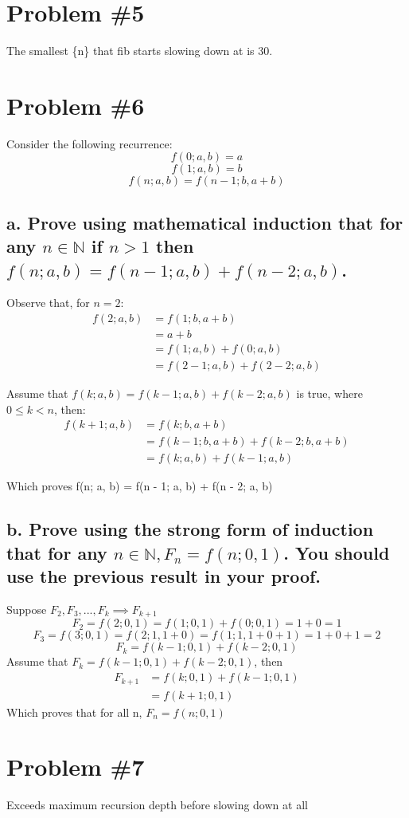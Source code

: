 \documentclass{article}
\newcommand {\N}{\mathbb{N}}
\begin{document}
\section*{Problem \#5}
The smallest \{n\} that fib starts slowing down at is 30.

\section*{Problem \#6}
Consider the following recurrence:
\[f(0; a, b) = a\]
\[f(1; a, b) = b\]
\[f(n; a, b) = f(n - 1; b, a + b)\]
\subsection*{a. Prove using mathematical induction that for any \(n \in \N\) if \(n > 1\) then \(f(n; a, b) = f(n - 1; a, b) + f(n - 2; a, b)\).}
Observe that, for \(n = 2\):
\begin{align}
f(2; a, b) &= f(1; b, a + b)\\
&= a + b\\
&= f(1; a, b) + f(0; a, b)\\
&= f(2 - 1; a, b) + f(2 - 2; a, b)
\end{align}

Assume that \(f(k; a, b) = f(k - 1; a, b) + f(k - 2; a, b)\) is true, where \(0 \leq k < n\), then:
\begin{align}
f(k + 1; a, b) &= f(k; b, a + b)\\
&= f(k - 1; b, a + b) + f(k - 2; b, a + b)\\
&= f(k; a, b) + f(k - 1; a, b)
\end{align}

Which proves f(n; a, b) = f(n - 1; a, b) + f(n - 2; a, b)
\subsection*{b. Prove using the strong form of induction that for any \(n \in \N, F_n = f(n; 0, 1)\). You should use the previous
result in your proof.}
Suppose \(F_2, F_3, ..., F_k \implies F_{k+1}\)
\[F_2 = f(2; 0, 1) = f(1; 0, 1) + f(0; 0, 1) = 1 + 0 = 1\]
\[F_3 = f(3; 0, 1) = f(2; 1, 1 + 0) = f(1; 1, 1 + 0 + 1) = 1 + 0 + 1 = 2\]
\[F_k = f(k - 1; 0, 1) + f(k - 2; 0, 1)\]
Assume that \(F_k = f(k - 1; 0, 1) + f(k - 2; 0, 1)\), then
\begin{align}
F_{k+1} &= f(k; 0, 1) + f(k - 1; 0, 1)\\
&= f(k + 1; 0, 1)
\end{align}
Which proves that for all n, \(F_n = f(n; 0, 1)\)
\section*{Problem \#7}
Exceeds maximum recursion depth before slowing down at all
\end{document}
